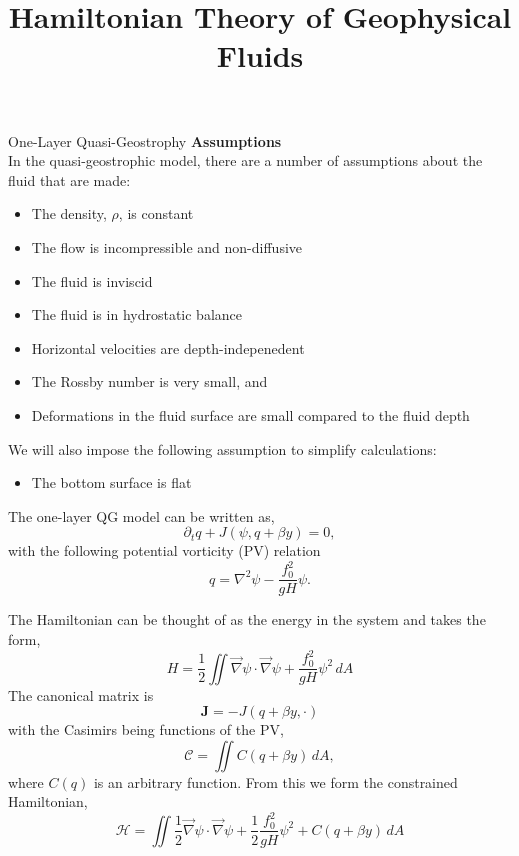 \documentclass[12pt]{article}
\begin{document}
\title{Hamiltonian Theory of Geophysical Fluids}

\begin{section}{One-Layer Quasi-Geostrophy}
    \textbf{Assumptions} \\
    In the quasi-geostrophic model, there are a number of assumptions about the fluid that are made:
    \begin{itemize}
        \item The density, $\rho$, is constant
        \item The flow is incompressible and non-diffusive
        \item The fluid is inviscid
        \item The fluid is in hydrostatic balance
        \item Horizontal velocities are depth-indepenedent
        \item The Rossby number is very small, and
        \item Deformations in the fluid surface are small compared to the fluid depth
    \end{itemize}
    We will also impose the following assumption to simplify calculations:
    \begin{itemize}
        \item The bottom surface is flat
    \end{itemize}

    The one-layer QG model can be written as,
    $$
    \partial_t q + J(\psi, q + \beta y) = 0,
    $$
    with the following potential vorticity (PV) relation
    $$
    q = \nabla^2 \psi - \frac{f_0^2}{gH} \psi.
    $$

    The Hamiltonian can be thought of as the energy in the system and takes the form,
    $$
    H =  \frac12 \iint \vec\nabla\psi \cdot \vec\nabla\psi + \frac{f_0^2}{g H} \psi^2 \, dA
    $$
    The canonical matrix is
    $$
    \mathbf{J} = -J(q + \beta y,\cdot)
    $$
    with the Casimirs being functions of the PV,
    $$
    \mathcal{C} = \iint C(q + \beta y) \, dA,
    $$
    where $C(q)$ is an arbitrary function. From this we form the constrained Hamiltonian,
    \begin{equation}
        \mathcal{H} = \iint  \frac12 \vec\nabla\psi \cdot \vec\nabla\psi + \frac12 \frac{f_0^2}{g H} \psi^2 + C(q + \beta y) \, dA
        \label{eqn:qg_ol_h}
    \end{equation}


\end{section}
\end{document}
